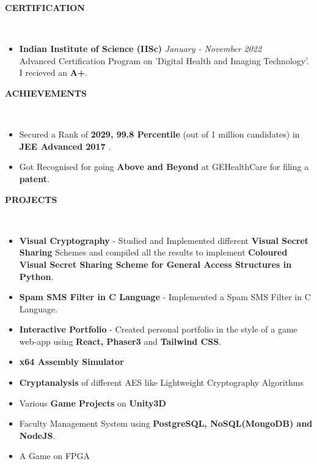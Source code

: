 \documentclass[a4paper,10pt]{article}
\newcommand{\lsep}{-0.6cm}
\newcommand{\resheading}[1]{{\small \colorbox{mygrey}{\begin{minipage}{0.975\textwidth}{\textbf{#1 \vphantom{p\^{E}}}}\end{minipage}}}}
\begin{document}
\resheading{\textbf{CERTIFICATION} }\\[\lsep]
\vspace{1.0pt}
\begin{itemize}
\item \textbf{Indian Institute of Science (IISc)} \hfill \emph{January - November 2022}\\
Advanced Certification Program on 'Digital Health and Imaging Technology'. I recieved an \textbf{A+}. 
\end{itemize}

\resheading{\textbf{ACHIEVEMENTS} }\\[\lsep]
\vspace{1.0pt}

\begin{itemize}
\setlength{\itemsep}{1pt}
\setlength{\parskip}{0pt}
\setlength{\parsep}{0pt}
\item Secured a Rank of \textbf{2029, 99.8 Percentile} (out of 1 million candidates) in \textbf{JEE Advanced 2017} .
\item Got Recognised for going \textbf{Above and Beyond} at GEHealthCare for filing a \textbf{patent}.
\end{itemize}

\resheading{\textbf{PROJECTS} }\\[\lsep]
\vspace{1.0pt}
\begin{itemize}
\setlength{\itemsep}{1pt}
\setlength{\parskip}{0pt}
\setlength{\parsep}{0pt}
\item \textbf{Visual Cryptography} - Studied and Implemented different \textbf{Visual Secret Sharing} Schemes and compiled all the results to implement \textbf{Coloured Visual Secret Sharing Scheme for General Access Structures in Python}. 	
\item \textbf{Spam SMS Filter in C Language} - Implemented a Spam SMS Filter in C Language.
\item \textbf{Interactive Portfolio} - Created personal portfolio in the style of a game web-app using \textbf{React, Phaser3} and \textbf{Tailwind CSS}.
\item \textbf{x64 Assembly Simulator}
\item \textbf{Cryptanalysis} of different AES like Lightweight Cryptography Algorithms
\item Various \textbf{Game Projects} on \textbf{Unity3D}
\item Faculty Management System using \textbf{PostgreSQL, NoSQL(MongoDB) and NodeJS}.
\item A Game on FPGA
\end{itemize}
\end{document}
